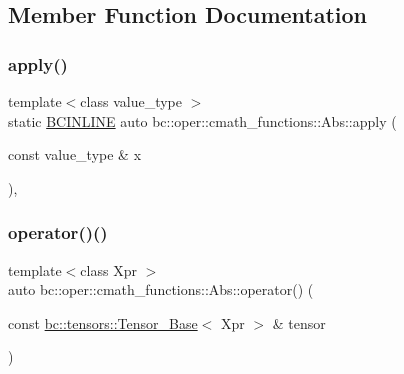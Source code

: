 \subsection{Member Function Documentation}
\mbox{\label{structbc_1_1oper_1_1cmath__functions_1_1Abs_a3470df75d49c41d6e766658d606d53b0}} 
\subsubsection{\texorpdfstring{apply()}{apply()}}
{\footnotesize\ttfamily template$<$class value\+\_\+type $>$ \\
static \hyperlink{common_8h_a6699e8b0449da5c0fafb878e59c1d4b1}{B\+C\+I\+N\+L\+I\+NE} auto bc\+::oper\+::cmath\+\_\+functions\+::\+Abs\+::apply (\begin{DoxyParamCaption}\item[{const value\+\_\+type \&}]{x }\end{DoxyParamCaption})\hspace{0.3cm}{\ttfamily [inline]}, {\ttfamily [static]}}

\mbox{\label{structbc_1_1oper_1_1cmath__functions_1_1Abs_a6f9be1d10e5348871dbb6702cf95ef0e}} 
\subsubsection{\texorpdfstring{operator()()}{operator()()}\hspace{0.1cm}{\footnotesize\ttfamily [1/3]}}
{\footnotesize\ttfamily template$<$class Xpr $>$ \\
auto bc\+::oper\+::cmath\+\_\+functions\+::\+Abs\+::operator() (\begin{DoxyParamCaption}\item[{const \hyperlink{classbc_1_1tensors_1_1Tensor__Base}{bc\+::tensors\+::\+Tensor\+\_\+\+Base}$<$ Xpr $>$ \&}]{tensor }\end{DoxyParamCaption})\hspace{0.3cm}{\ttfamily [inline]}}

